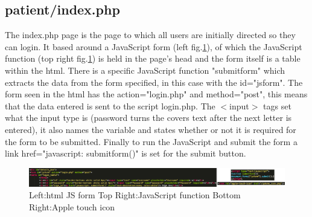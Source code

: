 \documentclass[11pt]{article}
\begin{document}
\subsection{patient/index.php}
The index.php page is the page to which all users are initially directed so they can login. It based around a JavaScript form (left fig.\ref{logincode}), of which the JavaScript function (top right fig.\ref{logincode}) is held in the page's head and the form itself is a table within the html. There is a specific JavaScript function "submitform" which extracts the data from the form specified, in this case with the id="jsform". The form seen in the html has the action="login.php" and method="post", this means that the data entered is sent to the script login.php. The $<$input$>$ tags set what the input type is (password turns the covers text after the next letter is entered), it also names the variable and states whether or not it is required for the form to be submitted. Finally to run the JavaScript and submit the form a link href="javascript: submitform()" is set for the submit button. 
\begin{figure}[h!] 
\centering
\includegraphics[width=1.0\linewidth]{logincode.png}
\caption{Left:html JS form Top Right:JavaScript function Bottom Right:Apple touch icon \label{logincode}}
\end{figure} 
\end{document}
